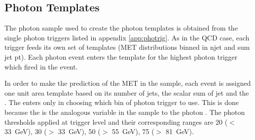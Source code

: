 \subsection{Photon Templates}
\label{sec:templatespho}

The photon sample used to create the photon templates is obtained from the single photon triggers 
listed in appendix \ref{app:photrig}. As in the QCD case, each trigger feeds its own set of templates 
(MET distributions binned in njet and sum jet pt).
Each photon event enters the template for the
highest \pt photon trigger which fired in the event. 

In order to make the prediction of the MET in the \Z sample, each \Z event is assigned one unit 
area template based on its number of jets, the scalar sum of jet \pt and the \Z \pt. 
The \Z \pt enters only in choosing which bin of photon trigger to use. 
This is done because the \Z \pt is the analogous variable in the \Z sample 
to the photon \pt. 
The photon \pt thresholds applied at trigger level and their corresponding \Z \pt ranges are 
20 (\Z \pt $<$ 33~GeV), 30 (\Z \pt $>$ 33~GeV), 50 (\Z \pt $>$ 55~GeV), 75 (\Z \pt $>$ 81~GeV).



